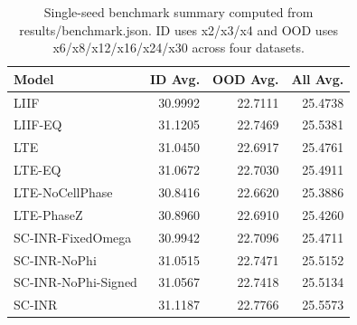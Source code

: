 \begin{table}[t]
\centering
\caption{Single-seed benchmark summary computed from results/benchmark.json. ID uses x2/x3/x4 and OOD uses x6/x8/x12/x16/x24/x30 across four datasets.}
\label{tab:single_seed_benchmark_summary}
\begin{tabular}{lrrr}
\toprule
Model & ID Avg. & OOD Avg. & All Avg. \\
\midrule
LIIF & 30.9992 & 22.7111 & 25.4738 \\
LIIF-EQ & 31.1205 & 22.7469 & 25.5381 \\
LTE & 31.0450 & 22.6917 & 25.4761 \\
LTE-EQ & 31.0672 & 22.7030 & 25.4911 \\
LTE-NoCellPhase & 30.8416 & 22.6620 & 25.3886 \\
LTE-PhaseZ & 30.8960 & 22.6910 & 25.4260 \\
SC-INR-FixedOmega & 30.9942 & 22.7096 & 25.4711 \\
SC-INR-NoPhi & 31.0515 & 22.7471 & 25.5152 \\
SC-INR-NoPhi-Signed & 31.0567 & 22.7418 & 25.5134 \\
SC-INR & 31.1187 & 22.7766 & 25.5573 \\
\bottomrule
\end{tabular}
\end{table}
